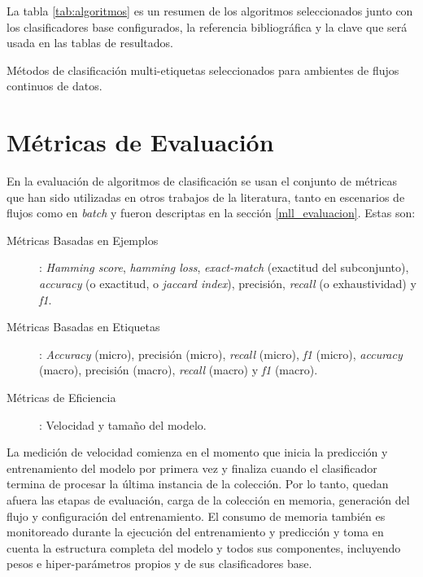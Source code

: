 La tabla \ref{tab:algoritmos} es un resumen de los algoritmos seleccionados
junto con los clasificadores base configurados, la referencia bibliográfica y la
clave que será usada en las tablas de resultados.

\begin{table}[htbp]
	\centering
	\begin{adjustbox}{max width=\textwidth}
		
	\end{adjustbox}
	\caption{Métodos de clasificación multi-etiquetas seleccionados para ambientes
		de flujos continuos de datos.}
	\label{tab:algoritmos}
\end{table}

\section{Métricas de Evaluación}

En la evaluación de algoritmos de clasificación se usan el conjunto de métricas
que han sido utilizadas en otros trabajos de la literatura, tanto en escenarios
de flujos \cite{sousa_multi-label_2018, zheng_survey_2020,
	osojnik_multi-label_2017} como en \textit{batch} \cite{madjarov_extensive_2012,
	zhang_multi-label_2010, gibaja_tutorial_2015} y fueron descriptas en la
sección \ref{mll_evaluacion}. Estas son:

\begin{description}

	\item[Métricas Basadas en Ejemplos]: \textit{Hamming score}, \textit{hamming
		      loss}, \textit{exact-match} (exactitud del subconjunto),
	      \textit{accuracy} (o exactitud, o \textit{jaccard index}), precisión,
	      \textit{recall} (o exhaustividad) y \textit{f1}.

	\item[Métricas Basadas en Etiquetas]: \textit{Accuracy} (micro), precisión
	      (micro), \textit{recall} (micro), \textit{f1} (micro),
	      \textit{accuracy} (macro), precisión (macro), \textit{recall} (macro)
	      y \textit{f1} (macro).

	\item[Métricas de Eficiencia]: Velocidad y tamaño del modelo.

\end{description}

La medición de velocidad comienza en el momento que inicia la predicción y
entrenamiento del modelo por primera vez y finaliza cuando el clasificador
termina de procesar la última instancia de la colección. Por lo tanto, quedan
afuera las etapas de evaluación, carga de la colección en memoria, generación
del flujo y configuración del entrenamiento. El consumo de memoria también es
monitoreado durante la ejecución del entrenamiento y predicción y toma en cuenta
la estructura completa del modelo y todos sus componentes, incluyendo pesos e
hiper-parámetros propios y de sus clasificadores base.

